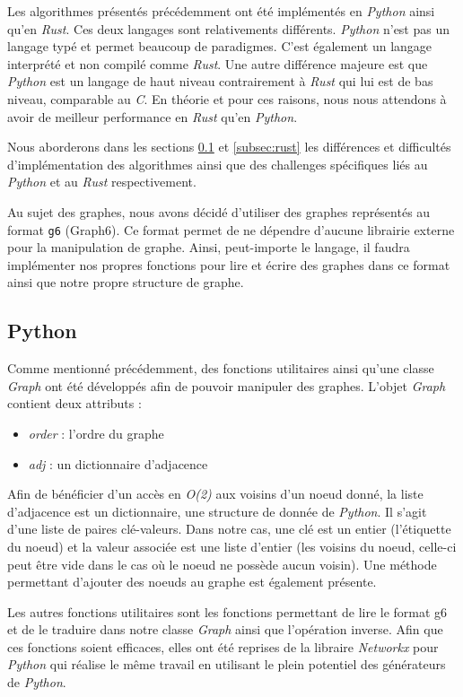 \documentclass[12pt,a4paper]{article}
\begin{document}
Les algorithmes présentés précédemment ont été implémentés en \textit{Python} ainsi qu'en \textit{Rust}. Ces deux langages sont relativements différents. \textit{Python} n'est pas un langage typé et permet beaucoup de paradigmes. C'est également un langage interprété et non compilé comme \emph{Rust}. Une autre différence majeure est que \emph{Python} est un langage de haut niveau contrairement à \emph{Rust} qui lui est de bas niveau, comparable au \emph{C}. En théorie et pour ces raisons, nous nous attendons à avoir de meilleur performance en \emph{Rust} qu'en \emph{Python}.

Nous aborderons dans les sections \ref{subsec:python} et \ref{subsec:rust} les différences et difficultés d'implémentation des algorithmes ainsi que des challenges spécifiques liés au \emph{Python} et au \emph{Rust} respectivement.

Au sujet des graphes, nous avons décidé d'utiliser des graphes représentés au format \texttt{g6} (Graph6\cite{g6}). Ce format permet de ne dépendre d'aucune librairie externe pour la manipulation de graphe. Ainsi, peut-importe le langage, il faudra implémenter nos propres fonctions pour lire et écrire des graphes dans ce format ainsi que notre propre structure de graphe.

\subsection{Python}%
\label{subsec:python}

Comme mentionné précédemment, des fonctions utilitaires ainsi qu'une classe \emph{Graph} ont été développés afin de pouvoir manipuler des graphes. L'objet \emph{Graph} contient deux attributs :
\begin{itemize}
  \item \emph{order} : l'ordre du graphe
  \item \emph{adj} : un dictionnaire d'adjacence
\end{itemize}

Afin de bénéficier d'un accès en \emph{O(2)} aux voisins d'un noeud donné, la liste d'adjacence est un dictionnaire, une structure de donnée de \emph{Python}. Il s'agit d'une liste de paires clé-valeurs. Dans notre cas, une clé est un entier (l'étiquette du noeud) et la valeur associée est une liste d'entier (les voisins du noeud, celle-ci peut être vide dans le cas où le noeud ne possède aucun voisin).
Une méthode permettant d'ajouter des noeuds au graphe est également présente.

Les autres fonctions utilitaires sont les fonctions permettant de lire le format g6 et de le traduire dans notre classe \emph{Graph} ainsi que l'opération inverse. Afin que ces fonctions soient efficaces, elles ont été reprises de la libraire \emph{Networkx} pour \emph{Python} qui réalise le même travail en utilisant le plein potentiel des générateurs de \emph{Python}.
\end{document}
